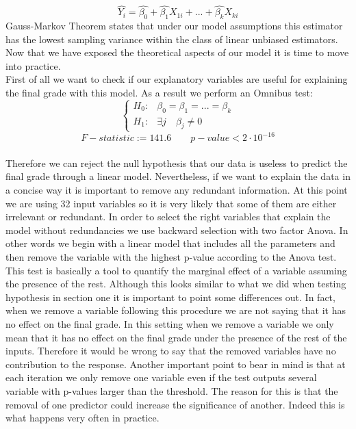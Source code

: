 \documentclass[a4paper, 11pt]{report}
\theoremstyle{definition}
\numberwithin{equation}{section}		%
\numberwithin{figure}{section}			%
\numberwithin{table}{section}				%
\begin{document}
$$\hat{Y_i} = \hat{\beta_0} + \hat{\beta_1}X_{1i} + ... +\hat{\beta_k}X_{ki}$$
Gauss-Markov Theorem states that under our model assumptions this estimator has the lowest sampling variance within the class of linear unbiased estimators. Now that we have exposed the theoretical aspects of our model it is time to move into practice.\\[0.3in]
First of all we want to check if our explanatory variables are useful for explaining the final grade with this model. As a result we perform an Omnibus test:
\begin{equation}
    \begin{cases}
      H_0:  & \beta_0 = \beta_1 = ... = \beta_k \\
      H_1:  & \exists j \quad  \beta_j \neq 0
    \end{cases}
  \end{equation}
  \bigskip
$$\boxed{F-statistic := 141.6 \quad \quad  p-value < 2\cdot 10^{-16}}$$
\\[0.2in]
Therefore we can reject the null hypothesis that our data is useless to predict the final grade through a linear model. Nevertheless, if we want to explain the data in a concise way it is important to remove any redundant information. At this point we are using 32 input variables so it is very likely that some of them are either irrelevant or redundant. In order to select the right variables that explain the model without redundancies we use backward selection with two factor Anova. In other words we begin with a linear model that includes all the parameters and then remove the variable with the highest p-value according to the Anova test. This test is basically a tool to quantify the marginal effect of a variable assuming the presence of the rest. Although this looks similar to what we did when testing hypothesis in section one it is important to point some differences out. In fact, when we remove a variable following this procedure we are not saying that it has no effect on the final grade. In this setting when we remove a variable we only mean that it has no effect on the final grade under the presence of the rest of the inputs. Therefore it would be wrong to say that the removed variables have no contribution to the response. Another important point to bear in mind is that at each iteration we only remove one variable even if the test outputs several variable with p-values larger than the threshold. The reason for this is that the removal of one predictor could increase the significance of another. Indeed this is what happens very often in practice.
\end{document}
